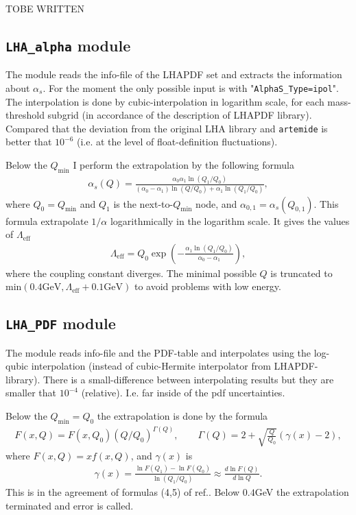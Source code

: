 \documentclass[prd,nofootinbib,eqsecnum,final]{revtex4}
\renewcommand{\(}{\left(}
\renewcommand{\)}{\right)}
\renewcommand{\[}{\left[}
\renewcommand{\]}{\right]}
\newcommand{\red}[1]{{\color[rgb]{1,0,0} #1}}
\begin{document}
\red{TOBE WRITTEN}

\subsection{\texttt{LHA\_alpha} module}

The module reads the info-file of the LHAPDF set and extracts the information about $\alpha_s$. For the moment the only possible input is with "\texttt{AlphaS\_Type=ipol}". The interpolation is done by cubic-interpolation in logarithm scale, for each mass-threshold subgrid (in accordance of the description of LHAPDF library). Compared that the deviation from the original LHA library and \texttt{artemide} is better that $10^{-6}$ (i.e. at the level of float-definition fluctuations).

Below the $Q_{\text{min}}$ I perform the extrapolation by the following formula
\begin{eqnarray}
\alpha_s(Q)=\frac{\alpha_0 \alpha_1 \ln(Q_1/Q_0)}{(\alpha_0-\alpha_1)\ln(Q/Q_0)+\alpha_1\ln(Q_1/Q_0)},
\end{eqnarray}
where $Q_0=Q_{\text{min}}$ and $Q_1$ is the next-to-$Q_{\min}$ node, and $\alpha_{0,1}=\alpha_s(Q_{0,1})$. This formula extrapolate $1/\alpha$ logarithmically in the logarithm scale. It gives the values of $\Lambda_{\text{eff}}$
\begin{eqnarray}
\Lambda_{\text{eff}}=Q_0\exp\(-\frac{\alpha_1 \ln(Q_1/Q_0)}{\alpha_0-\alpha_1}\),
\end{eqnarray}
where the coupling constant diverges. The minimal possible $Q$ is truncated to $\text{min}(0.4\text{GeV},\Lambda_{\text{eff}}+0.1\text{GeV})$ to avoid problems with low energy.

\subsection{\texttt{LHA\_PDF} module}

The module reads info-file and the PDF-table and interpolates using the log-qubic interpolation (instead of cubic-Hermite interpolator from LHAPDF-library). There is a small-difference between interpolating results but they are smaller that $10^{-4}$ (relative). I.e. far inside of the pdf uncertainties. 

Below the $Q_{\text{min}}=Q_0$ the extrapolation is done by the formula
\begin{eqnarray}
F(x,Q)=F(x,Q_0) (Q/Q_0)^{\Gamma(Q)},\qquad \Gamma(Q)=2+\sqrt{\frac{Q}{Q_0}}(\gamma(x)-2),
\end{eqnarray}
where $F(x,Q)=xf(x,Q)$, and $\gamma(x)$ is 
\begin{eqnarray}
\gamma(x)=\frac{\ln F(Q_1)-\ln F(Q_0)}{\ln(Q_1/Q_0)}\approx \frac{d \ln F(Q)}{d\ln Q}.
\end{eqnarray}
This is in the agreement of formulas (4,5) of ref.\cite{Buckley:2014ana}. Below $0.4$GeV the extrapolation terminated and error is called.
\end{document}
